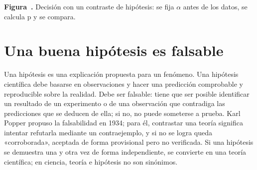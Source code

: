 \documentclass{book}
\newcounter{studiumfigure}
\begin{document}
\begin{minipage}{\linewidth}
%
\fi
\fi
\endgroup
\par\nopagebreak
{\small {}\label{fig:decision-valor-p}\textbf{Figura~\thestudiumfigure.} Decisión con un contraste de hipótesis: se fija \(\alpha\) antes de los datos, se calcula p y se compara.\par}
\end{minipage}
\par\vspace{\baselineskip}

\section{Una buena hipótesis es falsable}

Una hipótesis es una explicación propuesta para un fenómeno. Una hipótesis científica debe basarse en observaciones y hacer una predicción comprobable y reproducible sobre la realidad. Debe ser falsable: tiene que ser posible identificar un resultado de un experimento o de una observación que contradiga las predicciones que se deducen de ella; si no, no puede someterse a prueba. Karl Popper propuso la falsabilidad en 1934; para él, contrastar una teoría significa intentar refutarla mediante un contraejemplo, y si no se logra queda «corroborada», aceptada de forma provisional pero no verificada. Si una hipótesis se demuestra una y otra vez de forma independiente, se convierte en una teoría científica; en ciencia, teoría e hipótesis no son sinónimos.
\end{document}

